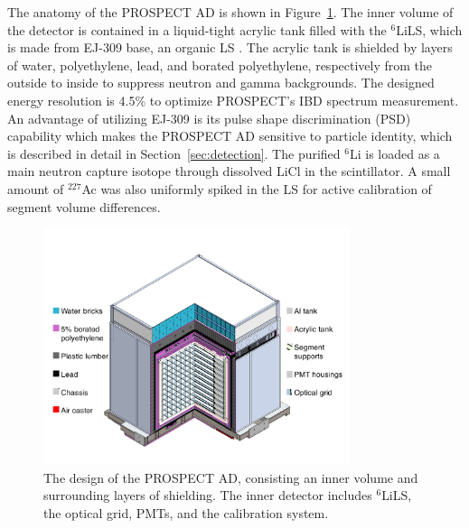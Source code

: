     The anatomy of the PROSPECT AD is shown in Figure~\ref{fig:PROSPECT_AD}.
    The inner volume of the detector is contained in a liquid-tight acrylic tank filled with the $^{6}$LiLS, which is made from EJ-309 base, an organic LS \cite{bib:lspaper}.
    The acrylic tank is shielded by layers of water, polyethylene, lead, and borated polyethylene, respectively from the outside to inside to suppress neutron and gamma backgrounds.
    The designed energy resolution is 4.5\% to optimize PROSPECT's IBD spectrum measurement.
    An advantage of utilizing EJ-309 is its pulse shape discrimination (PSD) capability which makes the PROSPECT AD sensitive to particle identity, which is described in detail in Section~\ref{sec:detection}.
    The purified $^{6}$Li is loaded as a main neutron capture isotope through dissolved LiCl in the scintillator.
    A small amount of $^{227}$Ac was also uniformly spiked in the LS for active calibration of segment volume differences.

\begin{figure}
    \centering
    \includegraphics[trim = 0cm 2cm 0cm 2cm, clip,width=0.8\textwidth]{Figures/DetectorDesign.pdf}
    \caption[The design of the PROSPECT AD]{The design of the PROSPECT AD, consisting an inner volume and surrounding layers of shielding.
    The inner detector includes $^{6}$LiLS, the optical grid, PMTs, and the calibration system.
    }
    \label{fig:PROSPECT_AD}
\end{figure}


